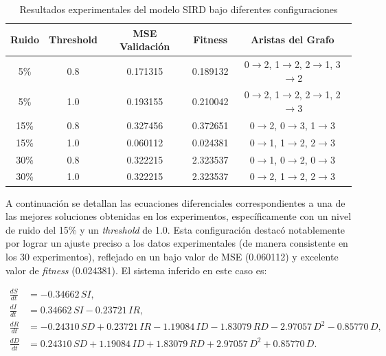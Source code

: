 \begin{table}[H]
\centering
\caption{Resultados experimentales del modelo SIRD bajo diferentes configuraciones}
\label{tab:resumen-sird}
\begin{tabular}{|c|c|c|c|c|}
\hline
\textbf{Ruido} & \textbf{Threshold} & \textbf{MSE Validación} & \textbf{Fitness} & \textbf{Aristas del Grafo} \\
\hline
5\% & 0.8 & 0.171315 & 0.189132 & 0$\rightarrow$2, 1$\rightarrow$2, 2$\rightarrow$1, 3$\rightarrow$2\\
5\% & 1.0 & 0.193155 & 0.210042 & 0$\rightarrow$2, 1$\rightarrow$2, 2$\rightarrow$1, 2$\rightarrow$3\\
15\% & 0.8 & 0.327456 & 0.372651 & 0$\rightarrow$2, 0$\rightarrow$3, 1$\rightarrow$3\\
15\% & 1.0 & 0.060112 & 0.024381 & 0$\rightarrow$1, 1$\rightarrow$2, 2$\rightarrow$3\\
30\% & 0.8 & 0.322215 & 2.323537 & 0$\rightarrow$1, 0$\rightarrow$2, 0$\rightarrow$3\\
30\% & 1.0 & 0.322215 & 2.323537 & 0$\rightarrow$2, 1$\rightarrow$2, 2$\rightarrow$3\\
\hline
\end{tabular}
\end{table}


A continuación se detallan las ecuaciones diferenciales correspondientes a una de las mejores soluciones obtenidas en los experimentos, específicamente con un nivel de ruido del 15\% y un \textit{threshold} de 1.0. Esta configuración destacó notablemente por lograr un ajuste preciso a los datos experimentales (de manera consistente en los 30 experimentos), reflejado en un bajo valor de MSE (0.060112) y excelente valor de \textit{fitness} (0.024381). El sistema inferido en este caso es:

\[
\begin{aligned}
\frac{dS}{dt} &= -0.34662\,S I, \\
\frac{dI}{dt} &= 0.34662\,S I - 0.23721\,I R, \\
\frac{dR}{dt} &= -0.24310\,S D + 0.23721\,I R - 1.19084\,I D - 1.83079\,R D - 2.97057\,D^2 - 0.85770\,D, \\
\frac{dD}{dt} &= 0.24310\,S D + 1.19084\,I D + 1.83079\,R D + 2.97057\,D^2 + 0.85770\,D.
\end{aligned}
\]

